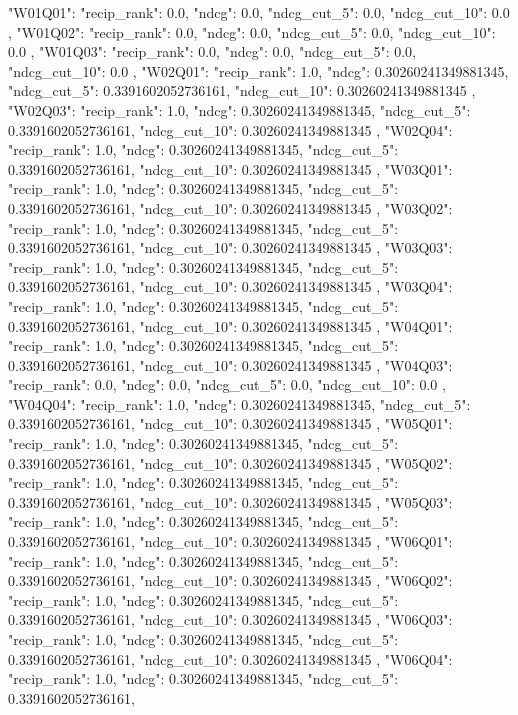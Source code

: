 {
 "W01Q01": {
  "recip_rank": 0.0,
  "ndcg": 0.0,
  "ndcg_cut_5": 0.0,
  "ndcg_cut_10": 0.0
 },
 "W01Q02": {
  "recip_rank": 0.0,
  "ndcg": 0.0,
  "ndcg_cut_5": 0.0,
  "ndcg_cut_10": 0.0
 },
 "W01Q03": {
  "recip_rank": 0.0,
  "ndcg": 0.0,
  "ndcg_cut_5": 0.0,
  "ndcg_cut_10": 0.0
 },
 "W02Q01": {
  "recip_rank": 1.0,
  "ndcg": 0.30260241349881345,
  "ndcg_cut_5": 0.3391602052736161,
  "ndcg_cut_10": 0.30260241349881345
 },
 "W02Q03": {
  "recip_rank": 1.0,
  "ndcg": 0.30260241349881345,
  "ndcg_cut_5": 0.3391602052736161,
  "ndcg_cut_10": 0.30260241349881345
 },
 "W02Q04": {
  "recip_rank": 1.0,
  "ndcg": 0.30260241349881345,
  "ndcg_cut_5": 0.3391602052736161,
  "ndcg_cut_10": 0.30260241349881345
 },
 "W03Q01": {
  "recip_rank": 1.0,
  "ndcg": 0.30260241349881345,
  "ndcg_cut_5": 0.3391602052736161,
  "ndcg_cut_10": 0.30260241349881345
 },
 "W03Q02": {
  "recip_rank": 1.0,
  "ndcg": 0.30260241349881345,
  "ndcg_cut_5": 0.3391602052736161,
  "ndcg_cut_10": 0.30260241349881345
 },
 "W03Q03": {
  "recip_rank": 1.0,
  "ndcg": 0.30260241349881345,
  "ndcg_cut_5": 0.3391602052736161,
  "ndcg_cut_10": 0.30260241349881345
 },
 "W03Q04": {
  "recip_rank": 1.0,
  "ndcg": 0.30260241349881345,
  "ndcg_cut_5": 0.3391602052736161,
  "ndcg_cut_10": 0.30260241349881345
 },
 "W04Q01": {
  "recip_rank": 1.0,
  "ndcg": 0.30260241349881345,
  "ndcg_cut_5": 0.3391602052736161,
  "ndcg_cut_10": 0.30260241349881345
 },
 "W04Q03": {
  "recip_rank": 0.0,
  "ndcg": 0.0,
  "ndcg_cut_5": 0.0,
  "ndcg_cut_10": 0.0
 },
 "W04Q04": {
  "recip_rank": 1.0,
  "ndcg": 0.30260241349881345,
  "ndcg_cut_5": 0.3391602052736161,
  "ndcg_cut_10": 0.30260241349881345
 },
 "W05Q01": {
  "recip_rank": 1.0,
  "ndcg": 0.30260241349881345,
  "ndcg_cut_5": 0.3391602052736161,
  "ndcg_cut_10": 0.30260241349881345
 },
 "W05Q02": {
  "recip_rank": 1.0,
  "ndcg": 0.30260241349881345,
  "ndcg_cut_5": 0.3391602052736161,
  "ndcg_cut_10": 0.30260241349881345
 },
 "W05Q03": {
  "recip_rank": 1.0,
  "ndcg": 0.30260241349881345,
  "ndcg_cut_5": 0.3391602052736161,
  "ndcg_cut_10": 0.30260241349881345
 },
 "W06Q01": {
  "recip_rank": 1.0,
  "ndcg": 0.30260241349881345,
  "ndcg_cut_5": 0.3391602052736161,
  "ndcg_cut_10": 0.30260241349881345
 },
 "W06Q02": {
  "recip_rank": 1.0,
  "ndcg": 0.30260241349881345,
  "ndcg_cut_5": 0.3391602052736161,
  "ndcg_cut_10": 0.30260241349881345
 },
 "W06Q03": {
  "recip_rank": 1.0,
  "ndcg": 0.30260241349881345,
  "ndcg_cut_5": 0.3391602052736161,
  "ndcg_cut_10": 0.30260241349881345
 },
 "W06Q04": {
  "recip_rank": 1.0,
  "ndcg": 0.30260241349881345,
  "ndcg_cut_5": 0.3391602052736161,
}}
